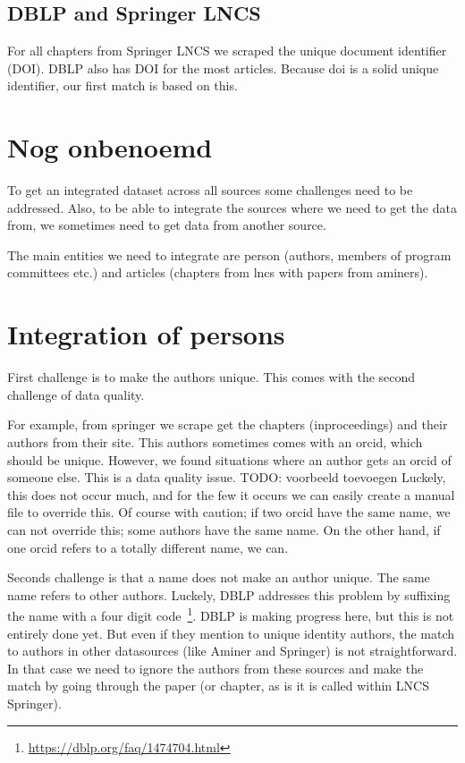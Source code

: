 \documentclass{ou-report}
\newcommand{\todo}[1]{{\color{red} TODO: #1}}
\begin{document}
\subsection{DBLP and Springer LNCS}
For all chapters from Springer LNCS we scraped the unique document identifier 
(DOI). DBLP also has DOI for the most articles.
Because doi is a solid unique identifier, our first match is based on this.



\section{Nog onbenoemd}


To get an integrated dataset across all sources some challenges need to be 
addressed. Also, to be able to integrate the sources where we need to get the
data from, we sometimes need to get data from another source.

The main entities we need to integrate are person (authors, members of program
committees etc.) and articles (chapters from lncs with papers from aminers).

\section{Integration of persons}

First challenge is to make the authors unique. This comes with the
second challenge of data quality.

For example, from springer we scrape get the chapters (inproceedings) and their 
authors from their site. This authors sometimes comes with an orcid, which 
should be unique. However, we found situations where an author gets an orcid of
someone else. This is a data quality issue.
\todo{voorbeeld toevoegen}
Luckely, this does not occur much, and for the few it occurs we can easily 
create a manual file to override this. Of course with caution; if two orcid 
have the same name, we can not override this; some authors have the same name.
On the other hand, if one orcid refers to a totally different name, we can.


Seconds challenge is that a name does not make an author unique. The same name
refers to other authors. Luckely, DBLP addresses this problem by suffixing the
name with a four digit code~\footnote{\url{https://dblp.org/faq/1474704.html}}.
DBLP is making progress here, but this is not entirely done yet. But even if
they mention to unique identity authors, the match to authors in other 
datasources (like Aminer and Springer) is not straightforward. In that case we 
need to ignore the authors from these sources and make the match by going 
through the paper (or chapter, as is it is called within LNCS Springer).
\end{document}
